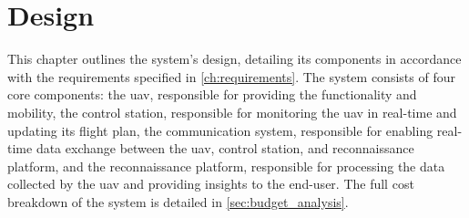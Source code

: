 \chapter{Design}\label{ch:design}

This chapter outlines the system's design, detailing its components in accordance with the requirements specified in \cref{ch:requirements}. The system consists of four core components: the \gls{uav}, responsible for providing the functionality and mobility, the control station, responsible for monitoring the \gls{uav} in real-time and updating its flight plan, the communication system, responsible for enabling real-time data exchange between the \gls{uav}, control station, and reconnaissance platform, and the reconnaissance platform, responsible for processing the data collected by the \gls{uav} and providing insights to the end-user. The full cost breakdown of the system is detailed in \cref{sec:budget_analysis}.





